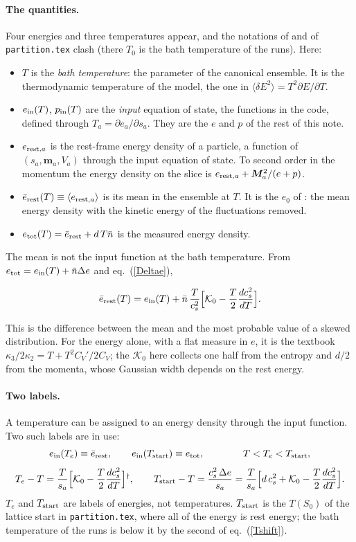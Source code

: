\documentclass[11pt,aps,preprint,nofootinbib,superscriptaddress,tightenlines]{revtex4-2}
\newcommand{\avg}[1]{\langle #1\rangle}
\newcommand{\unv}{\textsuperscript{$\dagger$}}
\def\st{\begin{equation}}
\def\stp{\end{equation}}
\def\Eq#1{eq.~(\ref{#1})}
\let\oldparagraph\paragraph
\renewcommand{\paragraph}{\par\bigskip\oldparagraph}
\begin{document}
\paragraph{The quantities.}  Four energies and three temperatures appear, and the notations of \cite{amt} and of \texttt{partition.tex} clash
(there $T_0$ is the bath temperature of the runs).  Here:
\begin{itemize}
\item $T$ is the \emph{bath temperature}: the parameter of the canonical ensemble.  It is the thermodynamic temperature of the model, the one in
  $\avg{\delta E^2}=T^2\partial E/\partial T$.
\item $e_{\rm in}(T)$, $p_{\rm in}(T)$ are the \emph{input} equation of state, the functions in the code, defined through $T_a=\partial e_a/\partial s_a$.  They are
  the $e$ and $p$ of the rest of this note.
\item $e_{{\rm rest},a}$ is the rest-frame energy density of a particle, a function of $(s_a,\bm m_a,V_a)$ through the input equation of state.
  To second order in the momentum the energy density on the slice is $e_{{\rm rest},a}+\bm M_a^2/(e+p)$.
\item $\bar e_{\rm rest}(T)\equiv\avg{e_{{\rm rest},a}}$ is its mean in the ensemble at $T$.  It is the $e_0$ of \cite{amt}: the mean energy density with the kinetic
  energy of the fluctuations removed.
\item $e_{\rm tot}(T)=\bar e_{\rm rest}+d\,T\bar n$ is the measured energy density.
\end{itemize}
The mean is not the input function at the bath temperature.  From $e_{\rm tot}=e_{\rm in}(T)+\bar n\Delta e$ and \Eq{Deltae},
\begin{keyeq}
\st
\bar e_{\rm rest}(T)=e_{\rm in}(T)+\bar n\,\frac{T}{c_s^2}\Big[\mathcal K_0-\frac T2\frac{dc_s^2}{dT}\Big] .
\label{erest}
\stp
\end{keyeq}
This is the difference between the mean and the most probable value of a skewed distribution.  For the energy alone, with a flat measure in
$e$, it is the textbook $\kappa_3/2\kappa_2=T+T^2C_V'/2C_V$; the $\mathcal K_0$ here collects one half from the entropy and $d/2$ from the momenta, whose
Gaussian width depends on the rest energy.

\paragraph{Two labels.}  A temperature can be assigned to an energy density through the input function.  Two such labels are in use:
\st
e_{\rm in}(T_e)\equiv\bar e_{\rm rest},\qquad e_{\rm in}(T_{\rm start})\equiv e_{\rm tot},\qquad\qquad T<T_e<T_{\rm start},
\stp
\st
T_e-T=\frac T{s_a}\Big[\mathcal K_0-\frac T2\frac{dc_s^2}{dT}\Big]\unv,\qquad
T_{\rm start}-T=\frac{c_s^2\,\Delta e}{s_a}=\frac T{s_a}\Big[d\,c_s^2+\mathcal K_0-\frac T2\frac{dc_s^2}{dT}\Big] .
\label{Tshift}
\stp
$T_e$ and $T_{\rm start}$ are labels of energies, not temperatures.  $T_{\rm start}$ is the $T(S_0)$ of the lattice start in \texttt{partition.tex}, where all of the
energy is rest energy; the bath temperature of the runs is below it by the second of \Eq{Tshift}.
\end{document}
